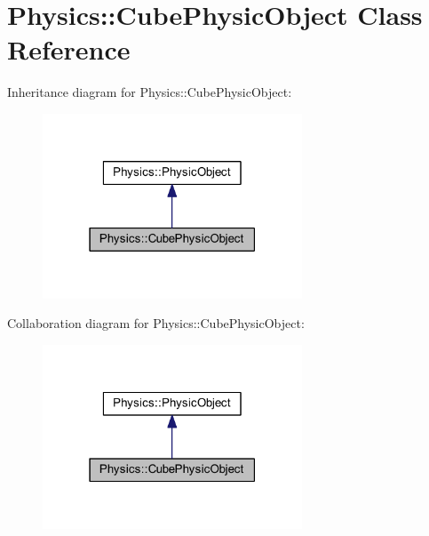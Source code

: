 \hypertarget{class_physics_1_1_cube_physic_object}{}\section{Physics\+:\+:Cube\+Physic\+Object Class Reference}
\label{class_physics_1_1_cube_physic_object}


Inheritance diagram for Physics\+:\+:Cube\+Physic\+Object\+:
\nopagebreak
\begin{figure}[H]
\begin{center}
\leavevmode
\includegraphics[width=219pt]{class_physics_1_1_cube_physic_object__inherit__graph}
\end{center}
\end{figure}


Collaboration diagram for Physics\+:\+:Cube\+Physic\+Object\+:
\nopagebreak
\begin{figure}[H]
\begin{center}
\leavevmode
\includegraphics[width=219pt]{class_physics_1_1_cube_physic_object__coll__graph}
\end{center}
\end{figure}
